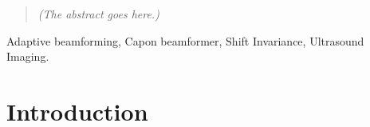 \documentclass[journal]{IEEEtran}
\newcommand\comment[1]{\textit{{\color{red}(#1)}}}
\begin{document}







\maketitle


\begin{abstract}
\comment{The abstract goes here.}
\end{abstract}

\begin{IEEEkeywords}
Adaptive beamforming, Capon beamformer, Shift Invariance, Ultrasound Imaging.
\end{IEEEkeywords}






%
\IEEEpeerreviewmaketitle



\section{Introduction}
% 
% 
% 
% 
\end{document}
